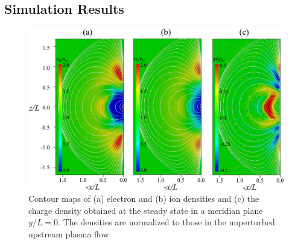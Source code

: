 \documentclass[draft,jgrga]{agutex2015}
\begin{document}
\begin{article}
\section{Simulation Results}

\begin{figure}[t]
\centering
\noindent\includegraphics[width=15cm]{./figures/Fig_2_bb-crop.pdf}
\caption{Contour maps of (a) electron and (b) ion densities and (c) the charge density 
obtained at the steady state in a meridian plane $y/L=0$. The densities are normalized
to those in the unperturbed upstream plasma flow}\label{fig:2}
\end{figure}


\end{article}
\end{document}
